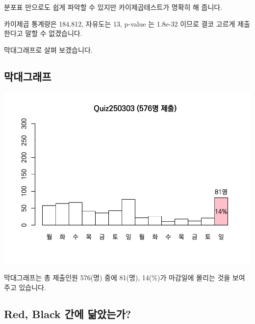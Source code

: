 \documentclass[
]{book}
\begin{document}
분포표 만으로도 쉽게 파악할 수 있지만 카이제곱테스트가 명확히 해 줍니다.

카이제곱 통계량은 184.812, 자유도는 13, p-value 는 1.8e-32 이므로 결코 고르게 제출한다고 말할 수 없겠습니다.

막대그래프로 살펴 보겠습니다.

\subsection{막대그래프}\label{uxb9c9uxb300uxadf8uxb798uxd504}

\includegraphics{Quiz_report_2025_files/figure-latex/unnamed-chunk-18-1.pdf}

막대그래프는 총 제출인원 576(명) 중에 81(명), 14(\%)가 마감일에 몰리는 것을 보여주고 있습니다.

\subsection{Red, Black 간에 닮았는가?}\label{red-black-uxac04uxc5d0-uxb2eeuxc558uxb294uxac00}
\end{document}
